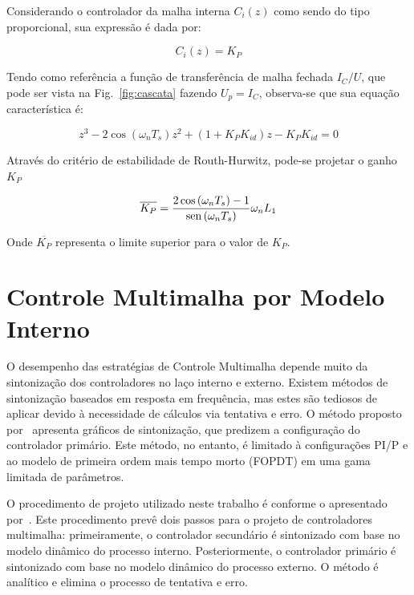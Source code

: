     Considerando o controlador da malha interna $C_i(z)$ como sendo do tipo proporcional, sua
    expressão é dada por:

    \begin{equation}
        C_i(z) = K_P
    \end{equation}

    Tendo como referência a função de transferência de malha fechada $I_C/U$, que pode ser vista
    na Fig.~\ref{fig:cascata} fazendo $U_p = I_C$, observa-se que sua equação característica é:

    \begin{equation}
        z^3 - 2 \cos \left( \omega_n T_s \right) z^2 + \left( 1 + K_P K_{id} \right) z -
            K_P K_{id} = 0
    \end{equation}

    Através do critério de estabilidade de Routh-Hurwitz, pode-se projetar o ganho $K_P$

    \begin{equation}
        \overline{K_P} = \frac{2 \cos \left( \omega_n T_s \right) - 1}
            {\operatorname{sen} \left( \omega_n T_s \right)} \omega_n L_1
    \end{equation}

    Onde $\overline{K_P}$ representa o limite superior para o valor de $K_P$.


\section{Controle Multimalha por Modelo Interno}

    O desempenho das estratégias de Controle Multimalha depende muito da sintonização
    dos controladores no laço interno e externo. Existem métodos de sintonização
    baseados em resposta em frequência, mas estes são tediosos de aplicar devido
    à necessidade de cálculos via tentativa e erro. O método proposto
    por~\cite{ref:KRISHNA} apresenta gráficos de sintonização, que predizem a
    configuração do controlador primário. Este método, no entanto, é limitado
    à configurações PI/P e ao modelo de primeira ordem mais tempo morto (FOPDT)
    em uma gama limitada de parâmetros.

    O procedimento de projeto utilizado neste trabalho é conforme o apresentado
    por~\cite{ref:LEE}. Este procedimento prevê dois passos para o projeto de
    controladores multimalha: primeiramente, o controlador secundário é sintonizado
    com base no modelo dinâmico do processo interno. Posteriormente, o controlador
    primário é sintonizado com base no modelo dinâmico do processo externo. O
    método é analítico e elimina o processo de tentativa e erro.

